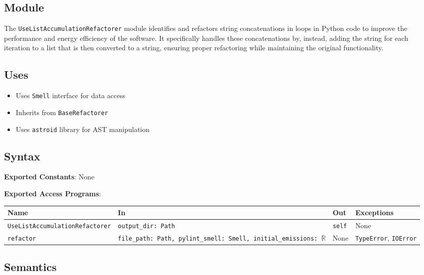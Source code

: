 \documentclass[12pt, titlepage]{article}
\begin{document}
  \subsection{Module}
  
  The \texttt{UseListAccumulationRefactorer} module identifies and refactors 
  string concatenations in loops in Python code to improve the performance and energy efficiency of the software. It specifically handles these concatenations by, instead, adding the string for each iteration to a list that is then converted to a string, ensuring proper refactoring while maintaining the original functionality.
  
  \subsection{Uses}
  \begin{itemize}
  \item Uses \texttt{Smell} interface for data access
  \item Inherits from \texttt{BaseRefactorer}
  \item Uses \texttt{astroid} library for AST manipulation
  \end{itemize}
  
  \subsection{Syntax}
  \noindent
  \textbf{Exported Constants}: None
  
  \noindent
  \textbf{Exported Access Programs}:
  
  \begin{tabularx}{\linewidth}{|
      l|
      >{\raggedright\arraybackslash}X|
      l|
      l|}
    \hline
    \textbf{Name} & \textbf{In} & \textbf{Out} & \textbf{Exceptions} \\
    \hline
    \texttt{UseListAccumulationRefactorer} & \texttt{output\_dir: Path} & \texttt{self} & None \\
    \hline
    \texttt{refactor} & \texttt{file\_path: Path, pylint\_smell: Smell, initial\_emissions: $\mathbb{R}$} & None & \texttt{TypeError}, \texttt{IOError} \\
    \hline
  \end{tabularx}
  
  \subsection{Semantics}
  
\end{document}

